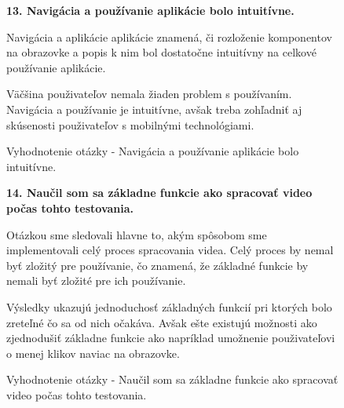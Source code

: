 \begin{figure}[H]
\textbf{13. Navigácia a používanie aplikácie bolo intuitívne.}

Navigácia a aplikácie aplikácie znamená, či rozloženie komponentov na obrazovke a popis k nim bol dostatočne intuitívny na celkové používanie aplikácie.

Väčšina použivateľov nemala žiaden problem s používaním. Navigácia a používanie je intuitívne, avšak treba zohľadniť aj skúsenosti použivateľov s mobilnými technológiami.

\caption{Vyhodnotenie otázky - Navigácia a používanie aplikácie bolo intuitívne.}
\end{figure}


\begin{figure}[H]
 \textbf{14. Naučil som sa základne funkcie ako spracovať video počas tohto testovania.}
 
 Otázkou sme sledovali hlavne to, akým spôsobom sme implementovali celý proces spracovania videa. Celý proces by nemal byť zložitý pre používanie, čo znamená, že základné funkcie by nemali byť zložité pre ich používanie.
 
 Výsledky ukazujú jednoduchosť základných funkcií pri ktorých bolo zreteľné čo sa od nich očakáva. Avšak ešte existujú možnosti ako zjednodušiť základne funkcie ako napríklad umožnenie použivateľovi o menej klikov naviac na obrazovke.

\caption{Vyhodnotenie otázky - Naučil som sa základne funkcie ako spracovať video počas tohto testovania.}
\end{figure}


